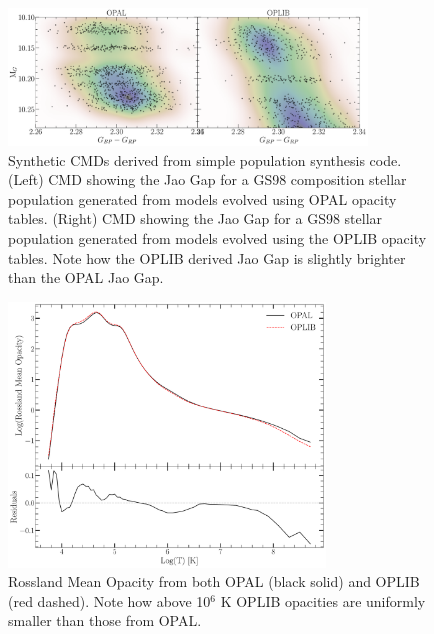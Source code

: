\begin{figure}
	\centering
	\includegraphics[width=0.85\textwidth]{src/figures/OPALOPLIB_popsynth_comp.pdf}
	\caption{Synthetic CMDs derived from simple population synthesis code.
	(Left) CMD showing the Jao Gap for a GS98 composition stellar population
	generated from models evolved using OPAL opacity tables. (Right) CMD showing
	the Jao Gap for a GS98 stellar population generated from models evolved
	using the OPLIB opacity tables. Note how the OPLIB derived Jao Gap is
	slightly brighter than the OPAL Jao Gap.}
	\label{fig:JaoGapOPALOPLIB}
\end{figure}

\begin{figure}
	\centering
	\includegraphics[width=0.75\textwidth]{src/figures/OpacityComparision.pdf}
	\caption{Rossland Mean Opacity from both OPAL (black solid) and OPLIB (red
	dashed). Note how above 10$^{6}$ K OPLIB opacities are uniformly smaller
	than those from OPAL.}
	\label{fig:opacComp}
\end{figure}

